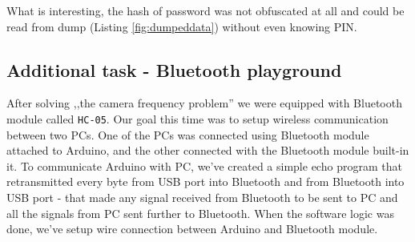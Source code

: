 What is interesting, the hash of password was not obfuscated at all and could be read from dump (Listing \ref{fig:dumpeddata}) without even knowing PIN.

\subsection{Additional task - Bluetooth playground}

After solving ,,the camera frequency problem'' we were equipped with Bluetooth module called \texttt{HC-05}. Our goal this time was to setup wireless communication between two PCs. One of the PCs was connected using Bluetooth module attached to Arduino, and the other connected with the Bluetooth module built-in it. To communicate Arduino with PC, we've created a simple echo program that retransmitted every byte from USB port into Bluetooth and from Bluetooth into USB port - that made any signal received from Bluetooth to be sent to PC and all the signals from PC sent further to Bluetooth. When the software logic was done, we've setup wire connection between Arduino and Bluetooth module.



